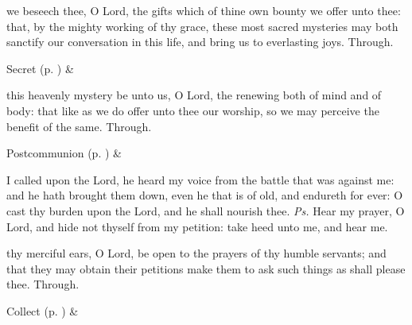 
\secret
{} we beseech thee, O Lord, the gifts which of thine own bounty we offer unto thee: that, by the mighty working of thy grace, these most sacred mysteries may both sanctify our conversation in this life, and bring us to everlasting joys. Through.
\begin{rubric}
     Secret  (p. \pageref{SPSaints}) \&  
\end{rubric}


\postcommunion
{} this heavenly mystery be unto us, O Lord, the renewing both of mind and of body: that like as we do offer unto thee our worship, so we may perceive the benefit of the same. Through.
\begin{rubric}
     Postcommunion  (p. \pageref{SPSaints}) \&  
\end{rubric}


\clearpage
{}


\introit
{} I called upon the Lord, he heard my voice from the battle that was against me: and he hath brought them down, even he that is of old, and endureth for ever: O cast thy burden upon the Lord, and he shall nourish thee. \textit{Ps.} Hear my prayer, O Lord, and hide not thyself from my petition: take heed unto me, and hear me.

\collect
{} thy merciful ears, O Lord, be open to the prayers of thy humble servants; and that they may obtain their petitions make them to ask such things as shall please thee. Through.
\begin{rubric}
     Collect  (p. \pageref{SPSaints}) \&  
\end{rubric}

